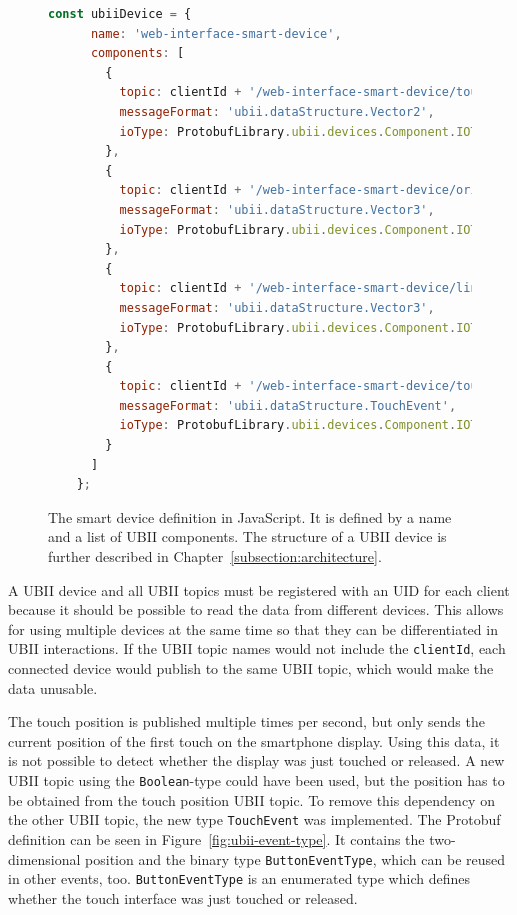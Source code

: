\begin{figure}[H]
  \begin{lstlisting}[language=JavaScript]
    const ubiiDevice = {
      name: 'web-interface-smart-device',
      components: [
        {
          topic: clientId + '/web-interface-smart-device/touch_position',
          messageFormat: 'ubii.dataStructure.Vector2',
          ioType: ProtobufLibrary.ubii.devices.Component.IOType.INPUT
        },
        {
          topic: clientId + '/web-interface-smart-device/orientation',
          messageFormat: 'ubii.dataStructure.Vector3',
          ioType: ProtobufLibrary.ubii.devices.Component.IOType.INPUT
        },
        {
          topic: clientId + '/web-interface-smart-device/linear_acceleration',
          messageFormat: 'ubii.dataStructure.Vector3',
          ioType: ProtobufLibrary.ubii.devices.Component.IOType.INPUT
        },
        {
          topic: clientId + '/web-interface-smart-device/touch_events',
          messageFormat: 'ubii.dataStructure.TouchEvent',
          ioType: ProtobufLibrary.ubii.devices.Component.IOType.INPUT
        }
      ]
    };
  \end{lstlisting}
  \caption[Protobuf definition of the smart device]{The smart device definition in JavaScript. It is defined by a name and a list of \ac{UBII} components. The structure of a \ac{UBII} device is further described in Chapter~\ref{subsection:architecture}.}\label{fig:ubii-device-registration}
\end{figure}

A \ac{UBII} device and all \ac{UBII} topics must be registered with an \ac{UID} for each client because it should be possible to read the data from different devices. This allows for using multiple devices at the same time so that they can be differentiated in \ac{UBII} interactions. If the \ac{UBII} topic names would not include the \lstinline{clientId}, each connected device would publish to the same \ac{UBII} topic, which would make the data unusable.

The touch position is published multiple times per second, but only sends the current position of the first touch on the smartphone display. Using this data, it is not possible to detect whether the display was just touched or released. A new \ac{UBII} topic using the \lstinline{Boolean}-type could have been used, but the position has to be obtained from the touch position \ac{UBII} topic. To remove this dependency on the other \ac{UBII} topic, the new type \lstinline{TouchEvent} was implemented. The \ac{Protobuf} definition can be seen in Figure~\ref{fig:ubii-event-type}. It contains the two-dimensional position and the binary type \mbox{\lstinline{ButtonEventType},} which can be reused in other events, too. \lstinline{ButtonEventType} is an enumerated type which defines whether the touch interface was just touched or released.

